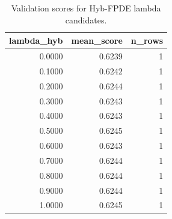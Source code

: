 \begin{table}[t]
\caption{Validation scores for Hyb-FPDE lambda candidates.}
\label{tab:lambda_distribution_computed}
\centering
\begin{tabular}{rrr}
\toprule
lambda\_hyb & mean\_score & n\_rows \\
\midrule
0.0000 & 0.6239 & 1 \\
0.1000 & 0.6242 & 1 \\
0.2000 & 0.6244 & 1 \\
0.3000 & 0.6243 & 1 \\
0.4000 & 0.6243 & 1 \\
0.5000 & 0.6245 & 1 \\
0.6000 & 0.6243 & 1 \\
0.7000 & 0.6244 & 1 \\
0.8000 & 0.6244 & 1 \\
0.9000 & 0.6244 & 1 \\
1.0000 & 0.6245 & 1 \\
\bottomrule
\end{tabular}

\end{table}
